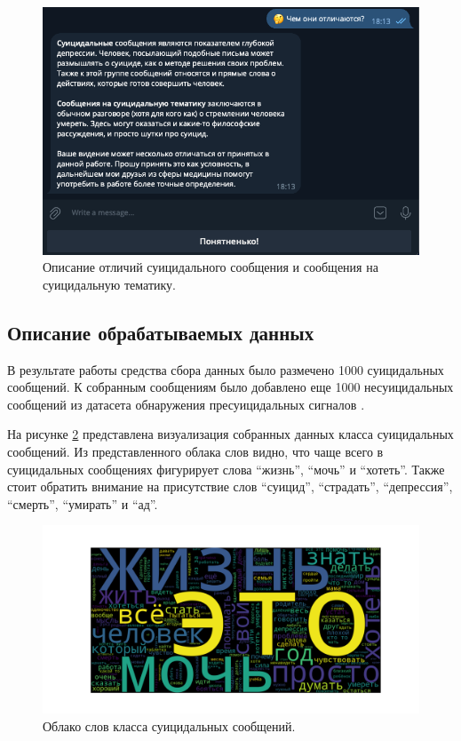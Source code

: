 \begin{figure}[H]
	\centering
	\includegraphics[width=\textwidth]{inc/teleg4.png}
	\caption{ Описание отличий суицидального сообщения и сообщения на суицидальную тематику. }
	\label{img:teleg4}
\end{figure}

\subsection{Описание обрабатываемых данных}

В результате работы средства сбора данных было размечено 1000 суицидальных сообщений. К собранным сообщениям было добавлено еще 1000 несуицидальных сообщений из датасета обнаружения пресуицидальных сигналов \cite{dataset}. 

На рисунке \ref{img:cloud1} представлена визуализация собранных данных класса суицидальных сообщений. Из представленного облака слов видно, что чаще всего в суицидальных сообщениях фигурирует слова ``жизнь'', ``мочь'' и ``хотеть''. Также стоит обратить внимание на присутствие слов ``суицид'', ``страдать'', ``депрессия'', ``смерть'', ``умирать'' и ``ад''.

\begin{figure}[H]
	\centering
	\includegraphics[width=\textwidth]{inc/cloudSuicidal.pdf}
	\caption{ Облако слов класса суицидальных сообщений. }
	\label{img:cloud1}
\end{figure}

